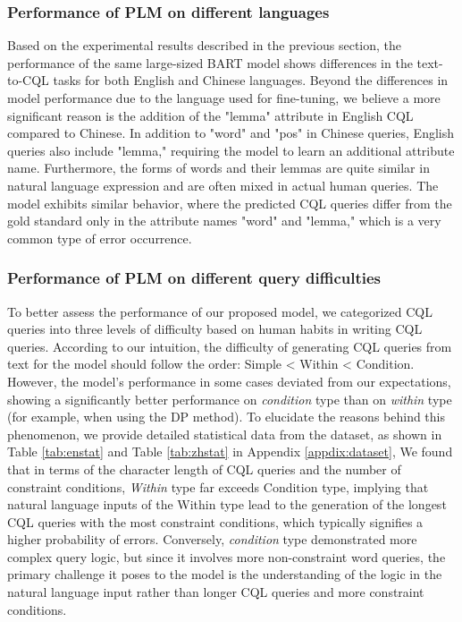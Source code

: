 \documentclass[11pt]{article}
\begin{document}
\begin{CJK*}{UTF8}{gbsn}
\subsubsection{Performance of PLM on different languages}
Based on the experimental results described in the previous section, the performance of the same large-sized BART model shows differences in the text-to-CQL tasks for both English and Chinese languages. Beyond the differences in model performance due to the language used for fine-tuning, we believe a more significant reason is the addition of the "lemma" attribute in English CQL compared to Chinese. In addition to "word" and "pos" in Chinese queries, English queries also include "lemma," requiring the model to learn an additional attribute name. Furthermore, the forms of words and their lemmas are quite similar in natural language expression and are often mixed in actual human queries. The model exhibits similar behavior, where the predicted CQL queries differ from the gold standard only in the attribute names "word" and "lemma," which is a very common type of error occurrence.

\subsubsection{Performance of PLM on different query difficulties}

To better assess the performance of our proposed model, we categorized CQL queries into three levels of difficulty based on human habits in writing CQL queries. According to our intuition, the difficulty of generating CQL queries from text for the model should follow the order: Simple < Within < Condition. However, the model's performance in some cases deviated from our expectations, showing a significantly better performance on \emph{condition} type than on \emph{within} type (for example, when using the DP method). To elucidate the reasons behind this phenomenon, we provide detailed statistical data from the dataset, as shown in Table \ref{tab:enstat} and Table \ref{tab:zhstat} in Appendix \ref{appdix:dataset}, We found that in terms of the character length of CQL queries and the number of constraint conditions, \emph{Within} type far exceeds Condition type, implying that natural language inputs of the Within type lead to the generation of the longest CQL queries with the most constraint conditions, which typically signifies a higher probability of errors. Conversely, \emph{condition} type demonstrated more complex query logic, but since it involves more non-constraint word queries, the primary challenge it poses to the model is the understanding of the logic in the natural language input rather than longer CQL queries and more constraint conditions.






\end{CJK*}
\end{document}

